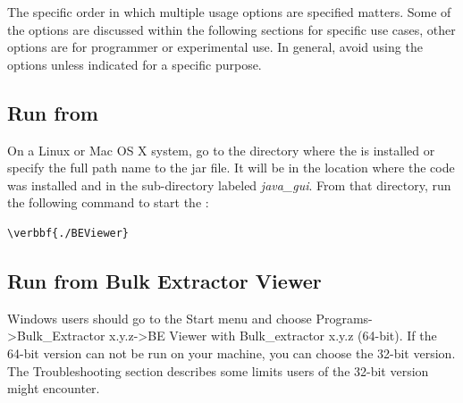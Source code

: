 \documentclass[11pt]{article} %
\begin{document}
The specific order in which multiple usage options are specified matters. Some of the options are discussed within the following sections for specific use cases, other options are for programmer or experimental use. In general, avoid using the options unless indicated for a specific purpose.\\

\subsection{Run \bulk from \viewer}
\label{RunningViewer}

On a Linux or Mac OS X system, go to the directory where the \viewer is installed or specify the full path name to the jar file. It will be in the location where the \bulk code was installed and in the sub-directory labeled \textit{java\_gui}. From that directory, run the following command to start the \viewer:
\begin{Verbatim}[commandchars=\\\{\}]
\verbbf{./BEViewer}
\end{Verbatim}

\subsection {Run \bulk from Bulk Extractor Viewer}

Windows users should go to the Start menu and choose Programs->Bulk\_Extractor x.y.z->BE Viewer with Bulk\_extractor x.y.z (64-bit). If the 64-bit version can not be run on your machine, you can choose the 32-bit version. The Troubleshooting section describes some limits users of the 32-bit version might encounter.\\
\end{document}
